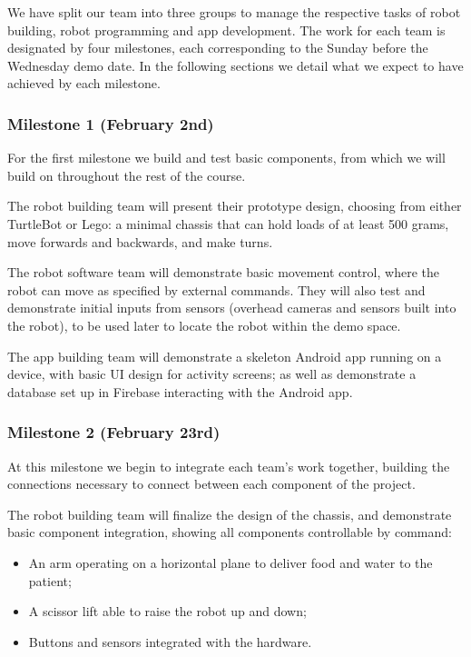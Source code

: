 \documentclass{article}
\begin{document}
We have split our team into three groups to manage the respective tasks of robot building, robot programming and app development. The work for each team is designated by four milestones, each corresponding to the Sunday before the Wednesday demo date. In the following sections we detail what we expect to have achieved by each milestone. 

\subsubsection{Milestone 1 (February 2nd)}
For the first milestone we build and test basic components, from which we will build on throughout the rest of the course. 

The robot building team will present their prototype design, choosing from either TurtleBot or Lego: a minimal chassis that can hold loads of at least 500 grams, move forwards and backwards, and make turns.

The robot software team will demonstrate basic movement control, where the robot can move as specified by external commands. They will also test and demonstrate initial inputs from sensors (overhead cameras and sensors built into the robot), to be used later to locate the robot within the demo space.

The app building team will demonstrate a skeleton Android app running on a device, with basic UI design for activity screens; as well as demonstrate a database set up in Firebase interacting with the Android app. 

\subsubsection{Milestone 2 (February 23rd)}
At this milestone we begin to integrate each team's work together, building the connections necessary to connect between each component of the project. 

The robot building team will finalize the design of the chassis, and demonstrate basic component integration, showing all components controllable by command:
\begin{itemize}
\item An arm operating on a horizontal plane to deliver food and water to the patient;
\item A scissor lift able to raise the robot up and down;
\item Buttons and sensors integrated with the hardware.
\end{itemize}
\end{document}
